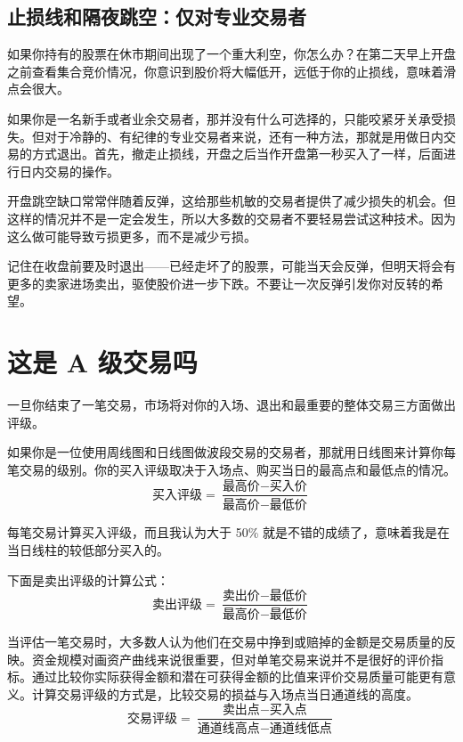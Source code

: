\subsection*{止损线和隔夜跳空：仅对专业交易者}
如果你持有的股票在休市期间出现了一个重大利空，你怎么办？在第二天早上开盘之前查看集合竞价情况，你意识到股价将大幅低开，远低于你的止损线，意味着滑点会很大。

如果你是一名新手或者业余交易者，那并没有什么可选择的，只能咬紧牙关承受损失。但对于冷静的、有纪律的专业交易者来说，还有一种方法，那就是用做日内交易的方式退出。首先，撤走止损线，开盘之后当作开盘第一秒买入了一样，后面进行日内交易的操作。

开盘跳空缺口常常伴随着反弹，这给那些机敏的交易者提供了减少损失的机会。但这样的情况并不是一定会发生，所以大多数的交易者不要轻易尝试这种技术。因为这么做可能导致亏损更多，而不是减少亏损。

记住在收盘前要及时退出——已经走坏了的股票，可能当天会反弹，但明天将会有更多的卖家进场卖出，驱使股价进一步下跌。不要让一次反弹引发你对反转的希望。
\section{这是 A 级交易吗}
一旦你结束了一笔交易，市场将对你的入场、退出和最重要的整体交易三方面做出评级。

如果你是一位使用周线图和日线图做波段交易的交易者，那就用日线图来计算你每笔交易的级别。你的买入评级取决于入场点、购买当日的最高点和最低点的情况。
\begin{equation}
    \text{买入评级}=\frac{\text{最高价}-\text{买入价}}{\text{最高价}-\text{最低价}}
\end{equation}

每笔交易计算买入评级，而且我认为大于 50\% 就是不错的成绩了，意味着我是在当日线柱的较低部分买入的。

下面是卖出评级的计算公式：
\begin{equation}
    \text{卖出评级}=\frac{\text{卖出价}-\text{最低价}}{\text{最高价}-\text{最低价}}
\end{equation}

当评估一笔交易时，大多数人认为他们在交易中挣到或赔掉的金额是交易质量的反映。资金规模对画资产曲线来说很重要，但对单笔交易来说并不是很好的评价指标。通过比较你实际获得金额和潜在可获得金额的比值来评价交易质量可能更有意义。计算交易评级的方式是，比较交易的损益与入场点当日通道线的高度。
\begin{equation}
    \text{交易评级}=\frac{\text{卖出点}-\text{买入点}}{\text{通道线高点}-\text{通道线低点}}
\end{equation}

